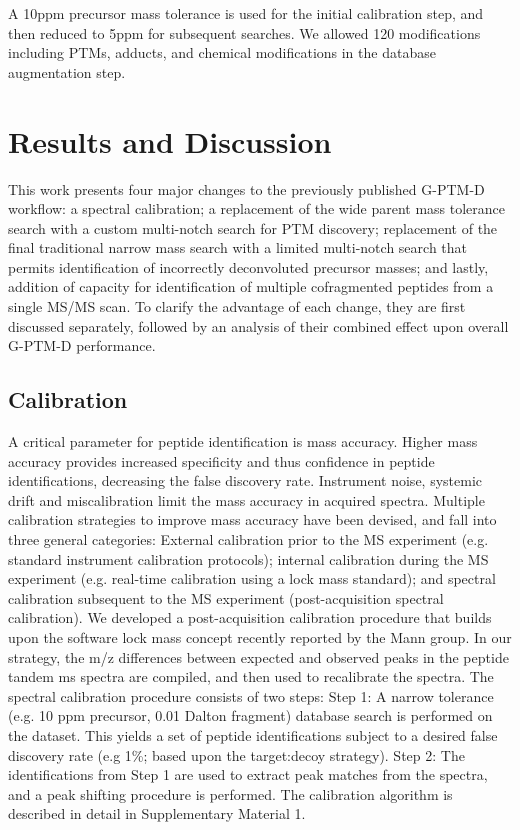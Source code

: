 \documentclass[journal=jprobs,manuscript=article]{achemso}
\begin{document}
A 10ppm precursor mass tolerance is used for the initial calibration step, and then reduced to 5ppm for subsequent searches.
We allowed 120 modifications including PTMs, adducts, and chemical modifications in the database augmentation step.

\section{Results and Discussion}

This work presents four major changes to the previously published G-PTM-D workflow:
a spectral calibration;
a replacement of the wide parent mass tolerance search with a custom multi-notch search for PTM discovery;
replacement of the final traditional narrow mass search with a limited multi-notch search that permits identification of incorrectly deconvoluted precursor masses;
and lastly, addition of capacity for identification of multiple cofragmented peptides from a single MS/MS scan.
To clarify the advantage of each change, they are first discussed separately, followed by an analysis of their combined effect upon overall G-PTM-D performance.

\subsection{Calibration}

A critical parameter for peptide identification is mass accuracy\cite{Scherl_2008}.
Higher mass accuracy provides increased specificity and thus confidence in peptide identifications, decreasing the false discovery rate.
Instrument noise, systemic drift and miscalibration limit the mass accuracy in acquired spectra.
Multiple calibration strategies to improve mass accuracy have been devised, and fall into three general categories: External calibration prior to the MS experiment (e.g. standard instrument calibration protocols); internal calibration during the MS experiment (e.g. real-time calibration using a lock mass standard\cite{Olsen_2005}); and spectral calibration subsequent to the MS experiment (post-acquisition spectral calibration).
We developed a post-acquisition calibration procedure that builds upon the software lock mass concept\cite{Cox_2011} recently reported by the Mann group.
In our strategy, the m/z differences between expected and observed peaks in the peptide tandem ms spectra are compiled, and then used to recalibrate the spectra.
The spectral calibration procedure consists of two steps: Step 1: A narrow tolerance (e.g. 10 ppm precursor, 0.01 Dalton fragment) database search is performed on the dataset.
This yields a set of peptide identifications subject to a desired false discovery rate (e.g 1\%; based upon the target:decoy strategy\cite{Elias_2007}).
Step 2: The identifications from Step 1 are used to extract peak matches from the spectra, and a peak shifting procedure is performed.
The calibration algorithm is described in detail in Supplementary Material 1.
\end{document}
